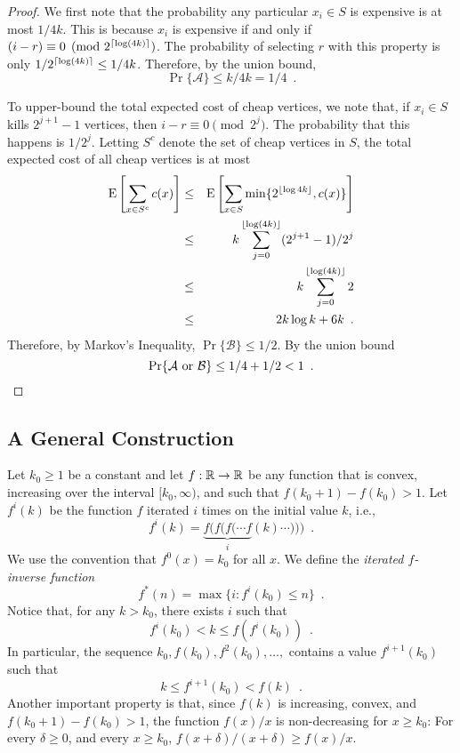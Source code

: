 \documentclass[final]{siamltex}
\begin{document}
\begin{proof}
  We first note that the probability any particular $x_i\in S$ is
  expensive is at most $1/4k$.  This is because $x_i$ is expensive if and
  only if $(i-r)\equiv 0 \pmod {2^{{\lceil \log(4k) \rceil}}}$.  The probability
  of selecting $r$ with this property is only $1/2^{{\lceil \log(4k) \rceil}}
  \le 1/4k$. Therefore, by the union bound,
  \[
     \Pr\{\mathcal{A}\} \le k/4k = 1/4 \enspace .
  \]

  To upper-bound the total expected cost of cheap vertices, we note that,
  if $x_i\in S$ kills $2^{j+1}-1$ vertices, then $i-r\equiv 0\pmod{2^j}$.
  The probability that this happens is $1/2^{j}$. 
  Letting $S^{c}$
  denote the set of cheap vertices in $S$, the total expected cost of
  all cheap vertices is at most
  \begin{eqnarray*}
     \mathrm{E}\left[\sum_{x\in S^{c}}c(x) \right] 
     &\le& \mathrm{E}\left[\sum_{x\in S}\min\{2^{{\lfloor \log 4k \rfloor}},c(x)\} \right]  \\
    &\le&  k\sum_{j=0}^{{\lfloor \log (4k) \rfloor}} (2^{j+1}-1)/2^j \\
     &\le& k\sum_{j=0}^{{\lfloor \log (4k) \rfloor}} 2 \\
     &\le & 2k\log k + 6k \enspace .
  \end{eqnarray*}
  Therefore, by Markov's Inequality, $\Pr\{\mathcal{B}\}\le 1/2$.
  By the union bound
  \[
     \Pr\{\mbox{$\mathcal{A}$ or $\mathcal{B}$}\} \le 1/4+ 1/2 < 1
  \enspace . \qedhere
  \]
\end{proof}

\subsection{A General Construction}

Let $k_0\ge 1$ be a constant and let $f:\mathbb{R}\rightarrow\mathbb{R}$ be any function
that is convex, increasing over the interval $[k_0,\infty)$, and such that
$f(k_0+1)-f(k_0) > 1$.  Let $f^{i}(k)$ be the function $f$ iterated $i$
times on the initial value $k$, i.e.,
\[
   f^{i}(k) = \underbrace{f(f(f(\cdots f}_{i}(k)\cdots))) \enspace .
\]
We use the convention that $f^0(x) = k_0$ for all $x$.  We define the
\emph{iterated $f$-inverse function}
\[
   f^*(n) = \max\{i : f^{i}(k_0) \le n\} \enspace .
\] 
Notice that, for any $k> k_0$, there exists $i$ such that
\[
   f^i(k_0) < k \le f(f^i(k_0)) \enspace .
\]
In particular, the sequence $k_0,f(k_0),f^2(k_0),\ldots,$ contains
a value $f^{i+1}(k_0)$ such that
\[
      k  \le  f^{i+1}(k_0) < f(k) \enspace .
\]
Another important property is that, since $f(k)$ is increasing, convex,
and $f(k_0+1)-f(k_0)>1$, the function $f(x)/x$ is non-decreasing
for $x\ge k_0$: For every $\delta\ge 0$, and every $x\ge k_0$,
$f(x+\delta)/(x+\delta) \ge f(x)/x$.
\end{document}
